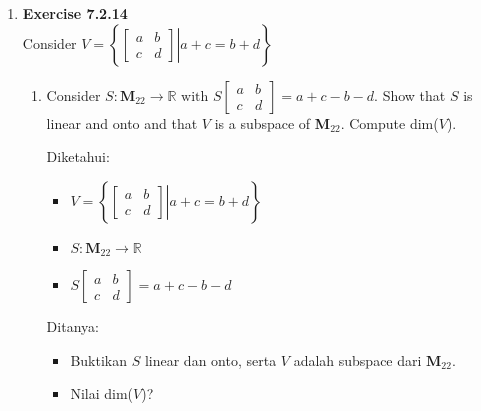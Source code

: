 \documentclass[12pt, a4paper]{scrartcl}
\begin{document}
\begin{enumerate}
        \item \textbf{Exercise 7.2.14}\\Consider $V = \left\{ \left. \begin{bmatrix}
            a & b\\
            c & d
        \end{bmatrix} \right| a+c=b+d \right\}$
        \begin{enumerate}
            \item Consider $S : \textbf{M}_{22} \to \mathbb{R} \mbox{ with } S \begin{bmatrix}
                a & b\\
                c & d
            \end{bmatrix} = a+c-b-d$. Show that $S$ is linear and onto and that $V$ is a subspace of \textbf{M}$_{22}$. Compute dim($V$).
            
            Diketahui:
            \begin{itemize}
                \item[] $V = \left\{ \left. \begin{bmatrix}
                    a & b\\
                    c & d
                \end{bmatrix} \right| a+c=b+d \right\}$\item[]$S : \textbf{M}_{22} \to \mathbb{R}$ \item[] $S \begin{bmatrix}
                    a & b\\
                    c & d
                \end{bmatrix} = a+c-b-d$
            \end{itemize}

            Ditanya:
            \begin{itemize}
                \item Buktikan $S$ linear dan onto, serta $V$ adalah subspace dari $\textbf{M}_{22}$.
                \item Nilai dim($V$)?
            \end{itemize}
            

\end{enumerate}
\end{enumerate}
\end{document}
